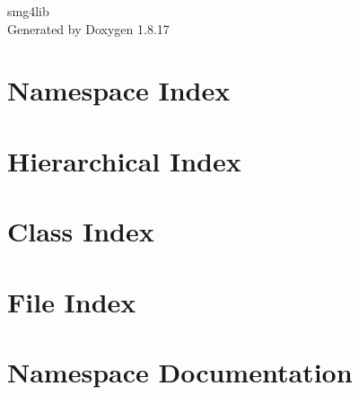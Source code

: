 \let\mypdfximage\pdfximage\def\pdfximage{\immediate\mypdfximage}\documentclass[twoside]{book}
\newcommand{\+}{\discretionary{\mbox{\scriptsize$\hookleftarrow$}}{}{}}
\newcommand{\clearemptydoublepage}{%
  \newpage{\pagestyle{empty}\cleardoublepage}%
}
\begin{document}
\hypersetup{pageanchor=false,
             bookmarksnumbered=true,
             pdfencoding=unicode
            }
\begin{titlepage}
\vspace*{7cm}
\begin{center}%
{\Large smg4lib }\\
\vspace*{1cm}
{\large Generated by Doxygen 1.8.17}\\
\end{center}
\end{titlepage}
\clearemptydoublepage
{}
\tableofcontents
\clearemptydoublepage
{}
\hypersetup{pageanchor=true}

\chapter{Namespace Index}

\chapter{Hierarchical Index}

\chapter{Class Index}

\chapter{File Index}

\chapter{Namespace Documentation}


\end{document}
